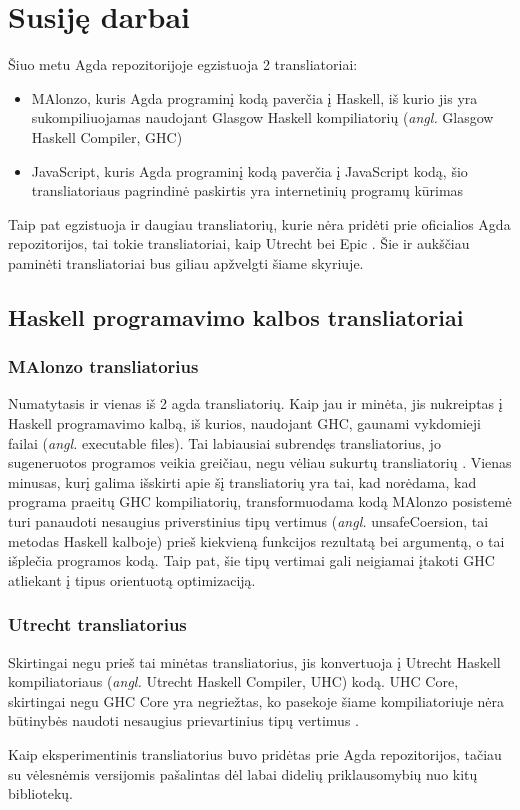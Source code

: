 \documentclass{VUMIFPSkursinis}
\begin{document}
\section{Susiję darbai}
Šiuo metu Agda repozitorijoje egzistuoja 2 transliatoriai: 
\begin{itemize}
	\item MAlonzo, kuris Agda programinį kodą paverčia į Haskell, iš kurio jis yra sukompiliuojamas naudojant Glasgow Haskell kompiliatorių (\textit{angl.} Glasgow Haskell Compiler, GHC)
	\item JavaScript, kuris Agda programinį kodą paverčia į JavaScript kodą, šio transliatoriaus pagrindinė paskirtis yra internetinių programų kūrimas \cite{html_agda}
\end{itemize}
Taip pat egzistuoja ir daugiau transliatorių, kurie nėra pridėti prie oficialios Agda repozitorijos, tai tokie transliatoriai, kaip Utrecht bei Epic \cite{Utrecht,Epic}. Šie ir aukščiau paminėti transliatoriai bus giliau apžvelgti šiame skyriuje.
\subsection{Haskell programavimo kalbos transliatoriai}
\subsubsection{MAlonzo transliatorius}
Numatytasis ir vienas iš 2 agda transliatorių. Kaip jau ir minėta, jis nukreiptas į Haskell programavimo kalbą, iš kurios, naudojant GHC, gaunami vykdomieji failai (\textit{angl.} executable files). Tai labiausiai subrendęs transliatorius, jo sugeneruotos programos veikia greičiau, negu vėliau sukurtų transliatorių \cite{Utrecht,Epic}. Vienas minusas, kurį galima išskirti apie šį transliatorių yra tai, kad norėdama, kad programa praeitų GHC kompiliatorių, transformuodama kodą MAlonzo posistemė turi panaudoti nesaugius priverstinius tipų vertimus (\textit{angl.} unsafeCoersion, tai metodas Haskell kalboje) prieš kiekvieną funkcijos rezultatą bei argumentą, o tai išplečia programos kodą. Taip pat, šie tipų vertimai gali neigiamai įtakoti GHC atliekant į tipus orientuotą optimizaciją.

\subsubsection{Utrecht transliatorius}
Skirtingai negu prieš tai minėtas transliatorius, jis konvertuoja į Utrecht Haskell kompiliatoriaus (\textit{angl.} Utrecht Haskell Compiler, UHC) kodą. UHC Core, skirtingai negu GHC Core yra negriežtas, ko pasekoje šiame kompiliatoriuje nėra būtinybės naudoti nesaugius prievartinius tipų vertimus \cite{Utrecht}.\par Kaip eksperimentinis transliatorius buvo pridėtas prie Agda repozitorijos, tačiau su vėlesnėmis versijomis pašalintas dėl labai didelių priklausomybių nuo kitų bibliotekų.
\end{document}
